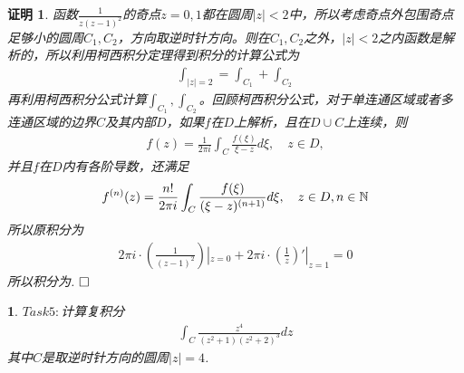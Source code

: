 \documentclass{ctexart}
\newcommand{\。}{．} %
\newenvironment{lanse}{
    \begin{tcolorbox}[breakable,enhanced, colback=qlan, boxrule=0pt, frame hidden,
        borderline west={0.7mm}{0.1mm}{slan}]
    }
    {\end{tcolorbox}}
\newenvironment{zise}{
    \begin{tcolorbox}[breakable,enhanced, colback=qzi, boxrule=0pt, frame hidden,
        borderline west={0.7mm}{0.1mm}{szi}]
    }
    {\end{tcolorbox}}
\theoremstyle{t} %
\newtheorem*{zmhj}{\color{slan} 证明}
\newtheorem*{smhj}{\color{slan} }
\newenvironment{zm}{\begin{lanse}\begin{zmhj}}{$\hfill \square$\end{zmhj}\end{lanse}}
\newenvironment{sm}{\begin{zise}\begin{smhj}}{\end{smhj}\end{zise}}
\begin{document}
\begin{zm}
    函数$\frac{1}{z(z-1)^2}$的奇点$z=0,1$都在圆周$|z|<2$中，所以考虑奇点外包围奇点足够小的圆周$C_1,C_2$，方向取逆时针方向。则在$C_1,C_2$之外，$|z|<2$之内函数是解析的，所以利用柯西积分定理得到积分的计算公式为
    \begin{align}
        \int_{|z|=2}=\int_{C_1}+\int_{C_2}
    \end{align}
    再利用柯西积分公式计算$\int_{C_1},\int_{C_2}$。回顾柯西积分公式，对于单连通区域或者多连通区域的边界$C$及其内部$D$，如果$f$在$D$上解析，且在$D\cup C$上连续，则
    \begin{align*}
        f(z)=\frac{1}{2\pi i}\int_{C}\frac{f(\xi)}{\xi-z}d\xi,\quad z\in D,
    \end{align*}
    并且$f$在$D$内有各阶导数，还满足
    \begin{align*}
        f^{(n)}(z)=\frac{n!}{2\pi i}\int_{C}\frac{f(\xi)}{(\xi-z)^{(n+1)}}d\xi,\quad z\in D,\space n\in\mathbb{N}
    \end{align*}
    所以原积分为
    \begin{align*}
        2\pi i\cdot \left(\frac{1}{(z-1)^2}\right)|_{z=0}+2\pi i\cdot\left(\frac{1}{z}\right)'|_{z=1}=0
    \end{align*}
    所以积分为.
\end{zm}
\begin{sm}
    $Task5:$计算复积分\begin{align*}
        \int_{C}\frac{z^4}{(z^2+1)(z^2+2)^3}dz
    \end{align*}
    其中$C$是取逆时针方向的圆周$|z|=4$.
\end{sm}
\end{document}

